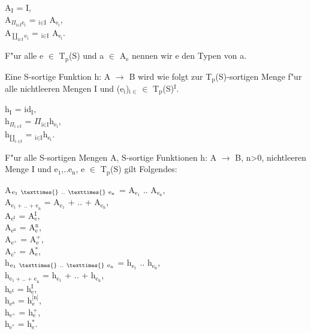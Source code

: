 \documentclass[11pt]{article}
\begin{document}
\begin{center}
A$_{\text{I}}$ = I, \\
A$_{\Pi_{\text{i} \in \text{I}}\text{e}_{\text{i}}}$ = \texttimes{}$_{\text{i} \in \text{I}}$ A$_{\text{e}_{\text{i}}}$, \\
A$_{\amalg_{\text{i} \in \text{I}}\text{e}_{\text{i}}}$ = \uplus$_{\text{i} \in \text{I}}$ A$_{\text{e}_{\text{i}}}$.
\end{center}

F"ur alle e $\in$ T$_{\text{p}}$(S) und a $\in$ A$_{\text{e}}$ nennen wir e den Typen von a.

Eine S-sortige Funktion h: A $\to$ B wird wie folgt zur T$_{\text{p}}$(S)-sortigen Menge f"ur alle nichtleeren Mengen I und (e$_{\text{i}}$)$_{\text{i } \in }$ 
$\in$ T$_{\text{p}}$(S)$^{\text{I}}$.

\begin{center}
h$_{\text{I}}$ = id$_{\text{I}}$, \\
h$_{\Pi_{\text{i } \in \text{I}}}$ = $\Pi$$_{\text{i} \in \text{I}}$h$_{\text{e}_{\text{i}}}$, \\
h$_{\amalg_{\text{i } \in \text{I}}}$ = \amalg$_{\text{i} \in \text{I}}$h$_{\text{e}_{\text{i}}}$.
\end{center}


F"ur alle S-sortigen Mengen A, S-sortige Funktionen h: A $\to$ B, n>0, nichtleeren Menge I und e$_{\text{1}}$,..e$_{\text{n}}$, e $\in$ T$_{\text{p}}$(S) gilt Folgendes:
\begin{center}
A$_{\text{e}_{\text{1}} \ \texttimes{}\ \text{.. }\texttimes{}\ \text{e}_{\text{n}}}$ = A$_{\text{e}_{\text{1}}}$ \texttimes{} .. \texttimes{} A$_{\text{e}_{\text{n}}}$, \\
A$_{\text{e}_{\text{1}} \ \text{+ .. + e}_{\text{n}}}$ = A$_{\text{e}_{\text{1}}}$ + .. + A$_{\text{e}_{\text{n}}}$, \\
A$_{\text{e}^{\text{I}}}$ = A$^{\text{I}}_{\text{e}}$, \\
A$_{\text{e}^{\text{n}}}$ = A$^{\text{n}}_{\text{e}}$, \\
A$_{\text{e}^{\text{+}}}$ = A$^{\text{+}}_{\text{e}}$, \\
A$_{\text{e}^{\text{*}}}$ = A$^{\text{*}}_{\text{e}}$, \\

h$_{\text{e}_{\text{1}} \ \texttimes{}\ \text{.. }\texttimes{}\ \text{e}_{\text{n}}}$ = h$_{\text{e}_{\text{1}}}$ \texttimes{} .. \texttimes{} h$_{\text{e}_{\text{n}}}$, \\
h$_{\text{e}_{\text{1}} \ \text{+ .. + e}_{\text{n}}}$ = h$_{\text{e}_{\text{1}}}$ + .. + h$_{\text{e}_{\text{n}}}$, \\
h$_{\text{e}^{\text{I}}}$ = h$^{\text{I}}_{\text{e}}$, \\
h$_{\text{e}^{\text{n}}}$ = h$^{\text{[n]}}_{\text{e}}$, \\
h$_{\text{e}^{\text{+}}}$ = h$^{\text{+}}_{\text{e}}$, \\
h$_{\text{e}^{\text{*}}}$ = h$^{\text{*}}_{\text{e}}$.
\end{center}
\end{document}
